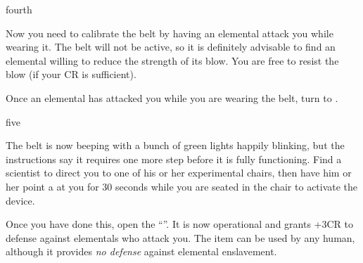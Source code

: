 \documentclass[notebook]{elementals}
\begin{document}
\begin{page}{fourth}

Now you need to calibrate the belt by having an elemental attack you while wearing it. The belt will not be active, so it is definitely advisable to find an elemental willing to reduce the strength of its blow. You are free to resist the blow (if your CR is sufficient).

Once an elemental has attacked you while you are wearing the belt, turn to .

\end{page}

\begin{page}{five}

The belt is now beeping with a bunch of green lights happily blinking, but the instructions say it requires one more step before it is fully functioning. Find a scientist to direct you to one of his or her experimental chairs, then have him or her point a \iHolographicLaser{} at you for 30 seconds while you are seated in the chair to activate the device.

Once you have done this, open the ``\iEleBelt{}''. It is now operational and grants +3CR to defense against elementals who attack you. The item can be used by any human, although it provides \emph{no defense} against elemental enslavement.

\end{page}

\endnotebook
\end{document}
